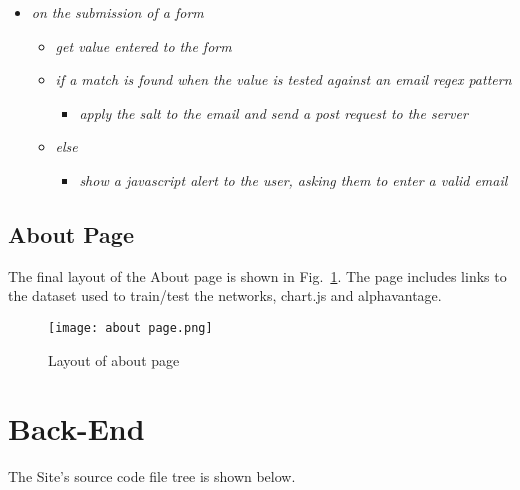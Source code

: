             \begin{itemize}
                \item \textit{on the submission of a form}
                \begin{itemize}
                    \item \textit{get value entered to the form}
                    \item \textit{if a match is found when the value is tested against an email regex pattern}
                    \begin{itemize}
                        \item \textit{apply the salt to the email and send a post request to the server}
                    \end{itemize}
                    \item \textit{else}
                    \begin{itemize}
                        \item \textit{show a javascript alert to the user, asking them to enter a valid email}
                    \end{itemize}
                \end{itemize}
            \end{itemize}

        \subsection{About Page}

        The final layout of the About page is shown in Fig.~\ref{fig:about_page}. The page includes links to the dataset used to train/test the networks, chart.js and alphavantage.

            \begin{figure}[htbp]
                \centering
                \texttt{[image: about page.png]}
                \caption{Layout of about page}
                \label{fig:about_page}
            \end{figure}

    \pagebreak
    \section{Back-End}

        The Site's source code file tree is shown below.

